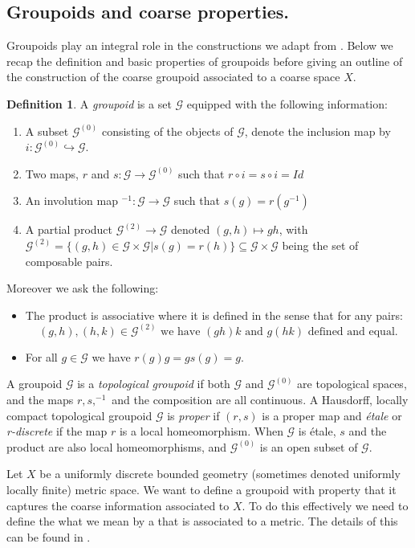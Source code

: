 \documentclass[11pt]{amsart}
\theoremstyle{plain}
\theoremstyle{definition}%
\newtheorem{definition}[theorem]{Definition}%
\theoremstyle{remark}%
\newcommand{\G}{\mathcal{G}}
\begin{document}
\subsection{Groupoids and coarse properties.}\label{sect:coarsegroupoids}
Groupoids play an integral role in the constructions we adapt from \cite{MR1905840}. Below we recap the definition and basic properties of groupoids before giving an outline of the construction of the coarse groupoid associated to a coarse space $X$.
\begin{definition}\label{def:grpoid2}
A \textit{groupoid} is a set $\G$ equipped with the following information:
\begin{enumerate}
\item A subset $\G^{(0)}$ consisting of the objects of $\G$, denote the inclusion map by $i: \G^{(0)}\hookrightarrow \G$. 
\item Two maps, $r$ and $s: \G  \rightarrow \G^{(0)}$ such that $r\circ i = s \circ i = Id$ 
\item An involution map $^{-1}:\G \rightarrow \G$ such that $s(g)=r(g^{-1})$
\item A partial product $\G^{(2)} \rightarrow \G$ denoted $(g,h) \mapsto gh$, with $\G^{(2)}=\lbrace (g,h) \in \G \times \G | s(g)=r(h) \rbrace\subseteq \G\times \G$ being the set of composable pairs.
\end{enumerate}
Moreover we ask the following:
\begin{itemize}
\item The product is associative where it is defined in the sense that for any pairs: 
\begin{equation*}
(g,h),(h,k)\in \G^{(2)} \mbox{ we have }(gh)k \mbox{ and } g(hk) \mbox{ defined and equal}.
\end{equation*}
\item For all $g \in \G$ we have $r(g)g=gs(g)=g$.
\end{itemize}
\end{definition}

A groupoid $\G$ is a \textit{topological groupoid} if both $\G$ and $\G^{(0)}$ are topological spaces, and the maps $r,s, ^{-1}$ and the composition are all continuous. A Hausdorff, locally compact topological groupoid $\G$ is \textit{proper} if $(r,s)$ is a proper map and \textit{\'etale} or \textit{r-discrete} if the map $r$ is a local homeomorphism. When $\G$ is \'etale, $s$ and the product are also local homeomorphisms, and $\G^{(0)}$ is an open subset of $\G$.

Let $X$ be a uniformly discrete bounded geometry (sometimes denoted uniformly locally finite) metric space. We want to define a groupoid with property that it captures the coarse information associated to $X$. To do this effectively we need to define the what we mean by a  that is associated to a metric. The details of this can be found in \cite{MR2007488}.
\end{document}
